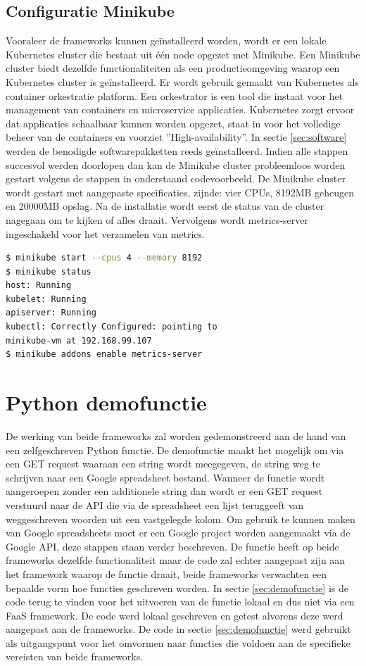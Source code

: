 \subsection{Configuratie Minikube}
\label{sec:configuratie-minikube}
Vooraleer de frameworks kunnen geïnstalleerd worden, wordt er een lokale Kubernetes cluster die bestaat uit één node opgezet met Minikube. Een Minikube cluster biedt dezelfde functionaliteiten als een productieomgeving waarop een Kubernetes cluster is geïnstalleerd. Er wordt gebruik gemaakt van Kubernetes als container orkestratie platform. Een orkestrator is een tool die instaat voor het management van containers en microservice applicaties. Kubernetes zorgt ervoor dat applicaties schaalbaar kunnen worden opgezet, staat in voor het volledige beheer van de containers en voorziet ''High-availability''.
In sectie \ref{sec:software} werden de benodigde softwarepakketten reeds geïnstalleerd. Indien alle stappen succesvol werden doorlopen dan kan de Minikube cluster probleemloos worden gestart volgens de stappen in onderstaand codevoorbeeld. De Minikube cluster wordt gestart met aangepaste specificaties, zijnde: vier CPUs, 8192MB geheugen en 20000MB opslag. Na de installatie wordt eerst de status van de cluster nagegaan om te kijken of alles draait. Vervolgens wordt metrics-server ingeschakeld voor het verzamelen van metrics.

\begin{lstlisting}[language=bash]
$ minikube start --cpus 4 --memory 8192
$ minikube status
host: Running
kubelet: Running
apiserver: Running
kubectl: Correctly Configured: pointing to
minikube-vm at 192.168.99.107
$ minikube addons enable metrics-server
\end{lstlisting}

\section{Python demofunctie}
\label{sec:python-demofunctie}
De werking van beide frameworks zal worden gedemonstreerd aan de hand van een zelfgeschreven Python functie. De demofunctie maakt het mogelijk om via een GET request waaraan een string wordt meegegeven, de string weg te schrijven naar een Google spreadsheet bestand. Wanneer de functie wordt aangeroepen zonder een additionele string dan wordt er een GET request verstuurd naar de API die via de spreadsheet een lijst teruggeeft van weggeschreven woorden uit een vastgelegde kolom. Om gebruik te kunnen maken van Google spreadsheets moet er een Google project worden aangemaakt via de Google API, deze stappen staan verder beschreven. De functie heeft op beide frameworks dezelfde functionaliteit maar de code zal echter aangepast zijn aan het framework waarop de functie draait, beide frameworks verwachten een bepaalde vorm hoe functies geschreven worden. In sectie \ref{sec:demofunctie} is de code terug te vinden voor het uitvoeren van de functie lokaal en dus niet via een FaaS framework. De code werd lokaal geschreven en getest alvorens deze werd aangepast aan de frameworks. De code in sectie \ref{sec:demofunctie} werd gebruikt als uitgangspunt voor het omvormen naar functies die voldoen aan de specifieke vereisten van beide frameworks. 

